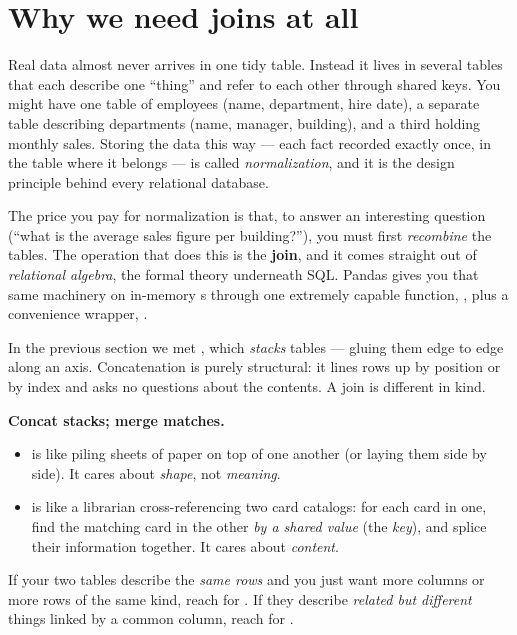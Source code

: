 \documentclass[11pt]{article}
\begin{document}

\section{Why we need joins at all}

\begin{background}
Real data almost never arrives in one tidy table. Instead it lives in several tables that each describe one ``thing'' and refer to each other through shared keys. You might have one table of employees (name, department, hire date), a separate table describing departments (name, manager, building), and a third holding monthly sales. Storing the data this way --- each fact recorded exactly once, in the table where it belongs --- is called \emph{normalization}, and it is the design principle behind every relational database.

The price you pay for normalization is that, to answer an interesting question (``what is the average sales figure per building?''), you must first \emph{recombine} the tables. The operation that does this is the \textbf{join}, and it comes straight out of \emph{relational algebra}, the formal theory underneath SQL. Pandas gives you that same machinery on in-memory s through one extremely capable function, , plus a convenience wrapper, .
\end{background}

In the previous section we met , which \emph{stacks} tables --- gluing them edge to edge along an axis. Concatenation is purely structural: it lines rows up by position or by index and asks no questions about the contents. A join is different in kind.

\begin{intuition}
\textbf{Concat stacks; merge matches.}
\begin{itemize}
  \item {} is like piling sheets of paper on top of one another (or laying them side by side). It cares about \emph{shape}, not \emph{meaning}.
  \item {} is like a librarian cross-referencing two card catalogs: for each card in one, find the matching card in the other \emph{by a shared value} (the \emph{key}), and splice their information together. It cares about \emph{content}.
\end{itemize}
If your two tables describe the \emph{same rows} and you just want more columns or more rows of the same kind, reach for . If they describe \emph{related but different} things linked by a common column, reach for .
\end{intuition}
\end{document}
